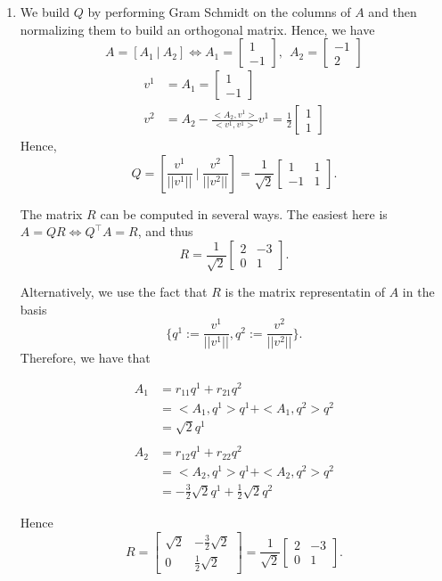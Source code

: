\documentclass[letterpaper]{article}
\begin{document}
\begin{enumerate}
        \item We build $Q$ by performing Gram Schmidt on the columns of $A$ and then normalizing them to build an orthogonal matrix. Hence,
        we have $$A=[A_1 ~|~ A_2] \Leftrightarrow A_1=\left[  \begin{array}{r} 1 \\ -1\end{array} \right],~~A_2=\left[  \begin{array}{r} -1 \\ 2\end{array} \right]$$
        \begin{align*}
        v^1&= A_1=\left[  \begin{array}{r} 1 \\ -1\end{array} \right]\\
        v^2&=A_2 - \frac{<A_2,v^1>}{<v^1, v^1>}v^1 = \frac{1}{2}\left[  \begin{array}{r} 1 \\ 1\end{array} \right]
        \end{align*}
        Hence, $$Q=\left[\frac{v^1}{||v^1||}~|~ \frac{v^2}{||v^2||} \right]= \frac{1}{\sqrt{2}} \left[  \begin{array}{rr} 1 & 1  \\ -1 & 1 \end{array} \right].$$

        The matrix $R$ can be computed in several ways. The easiest here is $A= Q R \Leftrightarrow Q^\top A=R$, and thus
        $$R=\frac{1}{\sqrt{2}} \left[  \begin{array}{rr} 2 & -3  \\ 0 & 1 \end{array} \right].$$

        \newpage
        Alternatively, we use the fact that $R$ is the matrix
        representatin of $A$ in the basis $$\{  q^1:=\frac{v^1}{||v^1||}, q^2:= \frac{v^2}{||v^2|| }  \} .$$
        Therefore, we have that

\begin{align*}
A_1 &= r_{11} q^1 + r_{21}q^2 \\
&= <A_1, q^1> q^1 + <A_1, q^2> q^2\\
&= \sqrt{2} q^1 \\
\\
A_2 &= r_{12} q^1 + r_{22}q^2 \\
&= <A_2, q^1> q^1 + <A_2, q^2> q^2\\
&= -\frac{3}{2} {\sqrt{2}} q^1  + \frac{1}{2}\sqrt{2} q^2
\end{align*}

Hence $$R=\left[  \begin{array}{rr} \sqrt{2}& -\frac{3}{2} {\sqrt{2}} \\ 0 &  \frac{1}{2}\sqrt{2} \end{array} \right] = \frac{1}{\sqrt{2}} \left[  \begin{array}{rr} 2 & -3  \\ 0 & 1 \end{array} \right].$$

\end{enumerate}
\end{document}
